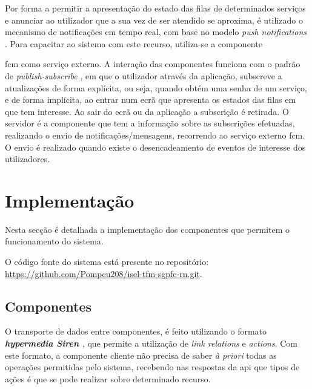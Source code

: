 Por forma a permitir a apresentação do estado das filas de determinados serviços e anunciar ao utilizador que a sua vez de ser atendido se aproxima, é utilizado o mecanismo de notificações em tempo real, com base no modelo \textit{push notifications} \cite{observerpattern}. Para capacitar ao sistema com este recurso, utiliza-se a componente {\acrshort{fcm} como serviço externo. A interação das componentes funciona com o padrão de \textit{publish-subscribe} \cite{publishsubscribe}, em que o utilizador através da aplicação, subscreve a atualizações de forma explícita, ou seja, quando obtém uma senha de um serviço, e de forma implícita, ao entrar num ecrã que apresenta os estados das filas em que tem interesse. Ao sair do ecrã ou da aplicação a subscrição é retirada. O servidor é a componente que tem a informação sobre as subscrições efetuadas, realizando o envio de notificações/mensagens, recorrendo ao serviço externo \acrshort{fcm}. O envio é realizado quando existe o desencadeamento de eventos de interesse dos utilizadores.

\section{Implementação} 
\label{sec:implementacao}
Nesta secção é detalhada a implementação dos componentes que permitem o funcionamento do sistema.

O código fonte do sistema está presente no repositório: \\ \url{https://github.com/Pompeu208/isel-tfm-sgpfe-rn.git}.

\subsection{Componentes} 

O transporte de dados entre componentes, é feito utilizando o formato \textbf{\textit{hypermedia Siren \cite{siren}}}, que permite a utilização de \textit{link relations} e \textit{actions}. Com este formato, a componente cliente não precisa de saber \textit{à priori} todas as operações permitidas pelo sistema, recebendo nas respostas da \acrshort{api} que tipos de ações é que se pode realizar sobre determinado recurso.

}
